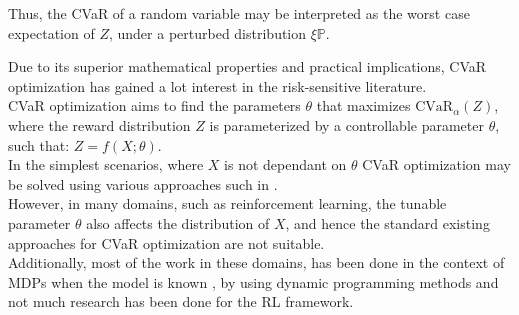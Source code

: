 Thus, the CVaR of a random variable may be interpreted as the worst case expectation of $Z$, under
a perturbed distribution $\xi \mathbb{P}$.

Due to its superior mathematical properties and practical implications, CVaR optimization has gained a lot interest in the
risk-sensitive literature.\\
CVaR optimization aims to find the parameters $\theta$ that maximizes $\text{CVaR}_\alpha (Z)$, where the
reward distribution $Z$ is parameterized by a controllable parameter $\theta$, such that: $Z = f(X; \theta)$.\\
In the simplest scenarios, where $X$ is not dependant on $\theta$ CVaR optimization may be solved using
various approaches such in \citet{Rockafellar2000}.\\
However, in many domains, such as reinforcement learning, the tunable parameter $\theta$ also affects the 
distribution of $X$, and hence the standard existing approaches for CVaR optimization are not suitable.\\
Additionally, most of the work in these domains, has been done in the context of MDPs when
the model is known \citep{Chow2015, Petrik2012}, by using dynamic programming methods
and not much research has been done for the RL framework.

